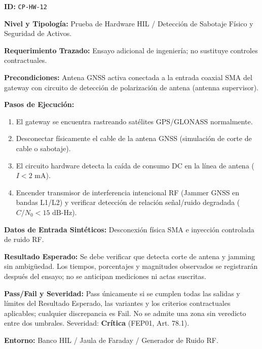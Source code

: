\par\noindent\textbf{ID:} \texttt{C\allowbreak{}P\allowbreak{}-\allowbreak{}H\allowbreak{}W\allowbreak{}-\allowbreak{}1\allowbreak{}2\allowbreak{}}\par
\par\noindent\textbf{Nivel y Tipología:} Prueba de Hardware HIL / Detección de Sabotaje Físico y Seguridad de Activos.\par
\par\noindent\textbf{Requerimiento Trazado:} Ensayo adicional de ingeniería; no sustituye controles contractuales.\par
\par\noindent\textbf{Precondiciones:} Antena GNSS activa conectada a la entrada coaxial SMA del gateway con circuito de detección de polarización de antena (antenna supervisor).\par
\par\noindent\textbf{Pasos de Ejecución:} \par
\begin{enumerate}
\item El gateway se encuentra rastreando satélites GPS/GLONASS normalmente.
\item Desconectar físicamente el cable de la antena GNSS (simulación de corte de cable o sabotaje).
\item El circuito hardware detecta la caída de consumo DC en la línea de antena (\(I < 2\text{ mA}\)).
\item Encender transmisor de interferencia intencional RF (Jammer GNSS en bandas L1/L2) y verificar detección de relación señal/ruido degradada (\(C/N_0 < 15\text{ dB-Hz}\)).
\end{enumerate}
\par\noindent\textbf{Datos de Entrada Sintéticos:} Desconexión física SMA e inyección controlada de ruido RF.\par
\par\noindent\textbf{Resultado Esperado:} Se debe verificar que detecta corte de antena y jamming sin ambigüedad. Los tiempos, porcentajes y magnitudes observados se registrarán después del ensayo; no se anticipan mediciones ni actas suscritas.\par
\par\noindent\textbf{Pass/Fail y Severidad:} Pass únicamente si se cumplen todas las salidas y límites del Resultado Esperado, las variantes y los criterios contractuales aplicables; cualquier discrepancia es Fail. No se admite una zona sin veredicto entre dos umbrales. Severidad: \textbf{Crítica} (FEP01, Art. 78.1).\par
\par\noindent\textbf{Entorno:} Banco HIL / Jaula de Faraday / Generador de Ruido RF.\par






